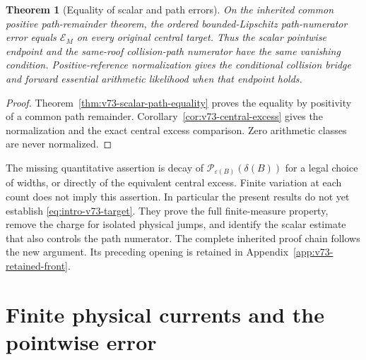 \documentclass[11pt,reqno]{amsart}
\numberwithin{equation}{section}
\newtheorem{revisiontheorem}{Theorem}
\theoremstyle{definition}\newtheorem{definition}[theorem]{Definition}
\theoremstyle{remark}\newtheorem{remark}[theorem]{Remark}
\begin{document}
\begin{revisiontheorem}[Equality of scalar and path errors]
\label{thm:intro-v73-path}
On the inherited common positive path-remainder theorem, the ordered
bounded-Lipschitz path-numerator error equals $\mathcal E_M$ on every
original central target. Thus the scalar pointwise endpoint and the
same-roof collision-path numerator have the same vanishing condition.
Positive-reference normalization gives the conditional collision bridge
and forward essential arithmetic likelihood when that endpoint holds.
\end{revisiontheorem}
\begin{proof}
Theorem~\ref{thm:v73-scalar-path-equality} proves the equality by
positivity of a common path remainder. Corollary~\ref{cor:v73-central-excess}
gives the normalization and the exact central excess comparison.
Zero arithmetic classes are never normalized.
\end{proof}

The missing quantitative assertion is decay of
$\mathcal P_{\varepsilon(B)}(\delta(B))$ for a legal choice of widths,
or directly of the equivalent central excess. Finite variation at each
count does not imply this assertion. In particular the present results
do not yet establish \eqref{eq:intro-v73-target}. They prove the full
finite-measure property, remove the charge for isolated physical jumps,
and identify the scalar estimate that also controls the path numerator.
The complete inherited proof chain follows the new argument. Its
preceding opening is retained in Appendix~\ref{app:v73-retained-front}.

\part{Finite physical currents and the pointwise error}






\clearpage


\end{document}
